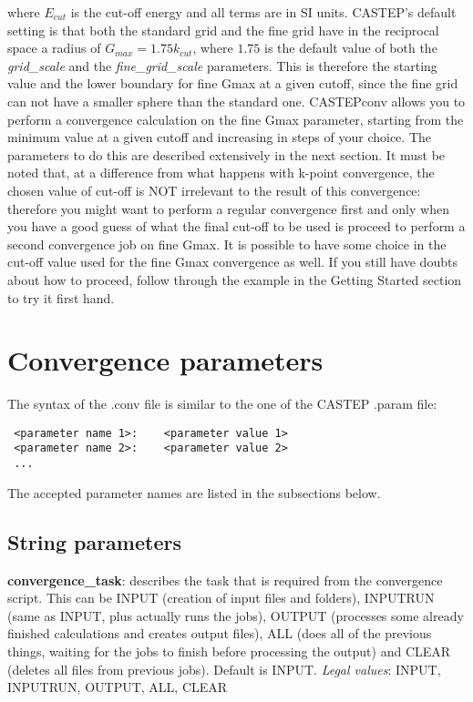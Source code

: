 \documentclass[10pt]{article}
\begin{document}
where $E_{cut}$ is the cut-off energy and all terms are in SI units. CASTEP's default setting is that both the standard grid and the fine grid have in the reciprocal space a radius of $G_{max} = 1.75k_{cut}$, where $1.75$ is the default value of both the \textit{grid\_scale} and the \textit{fine\_grid\_scale} parameters. This is therefore the starting value and the lower boundary for fine Gmax at a given cutoff, since the fine grid can not have a smaller sphere than the standard one.\newline
CASTEPconv allows you to perform a convergence calculation on the fine Gmax parameter, starting from the minimum value at a given cutoff and increasing in steps of your choice. The parameters to do this are described extensively in the next section. It must be noted that, at a difference from what happens with k-point convergence, the chosen value of cut-off is NOT irrelevant to the result of this convergence: therefore you might want to perform a regular convergence first and only when you have a good guess of what the final cut-off to be used is proceed to perform a second convergence job on fine Gmax. It is possible to have some choice in the cut-off value used for the fine Gmax convergence as well. If you still have doubts about how to proceed, follow through the example in the Getting Started section to try it first hand.

\section{Convergence parameters}

The syntax of the .conv file is similar to the one of the CASTEP .param file:

\begin{lstlisting}
 <parameter name 1>:    <parameter value 1>
 <parameter name 2>:    <parameter value 2>
 ...
\end{lstlisting}

The accepted parameter names are listed in the subsections below.

\subsection{String parameters}

\textbf{convergence\_task}: describes the task that is required from the 
convergence script. This can be INPUT (creation of input files and folders), 
INPUTRUN (same as INPUT, plus actually runs the jobs), OUTPUT (processes some 
already finished calculations and creates output files), ALL (does all of the 
previous things, waiting for the jobs to finish before processing the output) and CLEAR (deletes all files from previous jobs).\newline
Default is INPUT.\newline
\textit{Legal values}: INPUT, INPUTRUN, OUTPUT, ALL, CLEAR\newline
\end{document}
